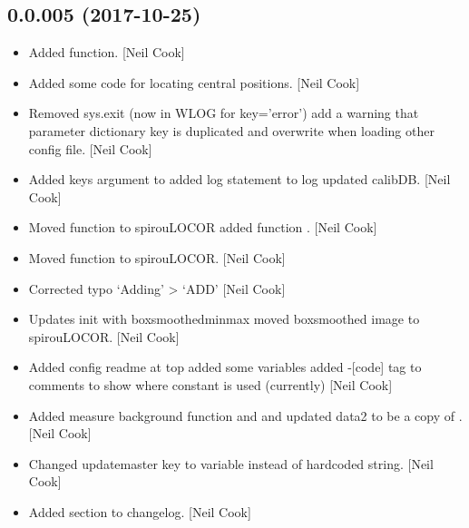 \documentclass[a4paper,10pt,english]{report}
\begin{document}
\subsection{0.0.005 (2017-10-25)}
\label{\detokenize{misc/changelog:id545}}\begin{itemize}
\item {} 
Added  function. {[}Neil Cook{]}

\item {} 
Added some code for locating central positions. {[}Neil Cook{]}

\item {} 
Removed sys.exit (now in WLOG for key=’error’) add a warning that
parameter dictionary key is duplicated and overwrite when loading
other config file. {[}Neil Cook{]}

\item {} 
Added keys argument to  added log statement to log
updated calibDB. {[}Neil Cook{]}

\item {} 
Moved  function to spirouLOCOR added function
. {[}Neil Cook{]}

\item {} 
Moved  function to spirouLOCOR. {[}Neil Cook{]}

\item {} 
Corrected typo ‘Adding’ \textendash{}\textgreater{} ‘ADD’ {[}Neil Cook{]}

\item {} 
Updates init with boxsmoothedminmax moved boxsmoothed image to
spirouLOCOR. {[}Neil Cook{]}

\item {} 
Added config readme at top added some  variables added -{[}code{]}
tag to comments to show where constant is used (currently) {[}Neil Cook{]}

\item {} 
Added measure background function and  and
 updated data2 to be a copy of
. {[}Neil Cook{]}

\item {} 
Changed updatemaster key to variable instead of hardcoded string.
{[}Neil Cook{]}

\item {} 
Added  section to changelog. {[}Neil Cook{]}


\end{itemize}
\end{document}

